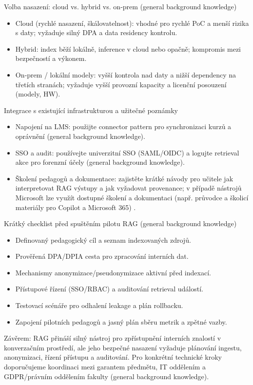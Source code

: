 \documentclass{report}%
\begin{document}
Volba nasazení: cloud vs. hybrid vs. on‑prem (general background knowledge)
\begin{itemize}
  \item Cloud (rychlé nasazení, škálovatelnost): vhodné pro rychlé PoC a menší rizika s daty; vyžaduje silný DPA a data residency kontrolu.
  \item Hybrid: index běží lokálně, inference v cloud nebo opačně; kompromis mezi bezpečností a výkonem.
  \item On‑prem / lokální modely: vyšší kontrola nad daty a nižší dependency na třetích stranách; vyžaduje vyšší provozní kapacity a licenční posouzení (modely, HW).
\end{itemize}

Integrace s existující infrastrukturou a užitečné poznámky
\begin{itemize}
  \item Napojení na LMS: použijte connector pattern pro synchronizaci kurzů a oprávnění (general background knowledge).
  \item SSO a audit: používejte univerzitní SSO (SAML/OIDC) a logujte retrieval akce pro forenzní účely (general background knowledge).
  \item Školení pedagogů a dokumentace: zajistěte krátké návody pro učitele jak interpretovat RAG výstupy a jak vyžadovat provenance; v případě nástrojů Microsoft lze využít dostupné školení a dokumentaci (např. průvodce a školicí materiály pro Copilot a Microsoft 365) \cite{kb_ai_101_tipu_pdf_04e4a115_page_44_2, kb_ai_101_tipu_pdf_04e4a115_page_8_1}.
\end{itemize}

Krátký checklist před spuštěním pilotu RAG (general background knowledge)
\begin{itemize}
  \item Definovaný pedagogický cíl a seznam indexovaných zdrojů.
  \item Prověřená DPA/DPIA cesta pro zpracování interních dat.
  \item Mechanismy anonymizace/pseudonymizace aktivní před indexací.
  \item Přístupové řízení (SSO/RBAC) a auditování retrieval událostí.
  \item Testovací scénáře pro odhalení leakage a plán rollbacku.
  \item Zapojení pilotních pedagogů a jasný plán sběru metrik a zpětné vazby.
\end{itemize}

Závěrem: RAG přináší silný nástroj pro zpřístupnění interních znalostí v konverzačním prostředí, ale jeho bezpečné nasazení vyžaduje plánování ingestu, anonymizaci, řízení přístupu a auditování. Pro konkrétní technické kroky doporučujeme koordinaci mezi garantem předmětu, IT oddělením a GDPR/právním oddělením fakulty (general background knowledge).%
\end{document}
